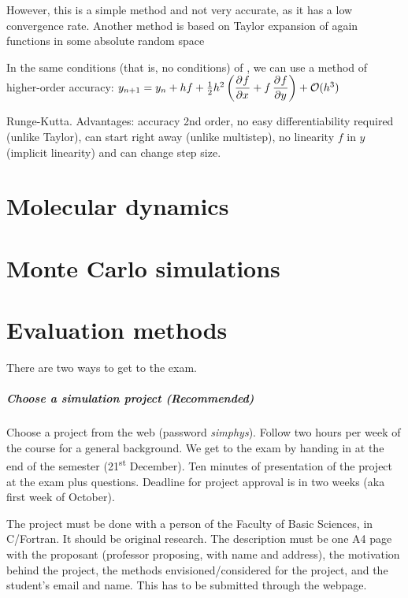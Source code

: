 \documentclass[palatino]{epflnotes}
\begin{document}
However, this is a simple method and not very accurate, as it has a low convergence rate. Another method is based on Taylor expansion of again functions in some absolute random space

\begin{prop} In the same conditions (that is, no conditions) of , we can use a method of higher-order accuracy: \( y_{n+1} = y_n + hf + \frac{1}{2}h^2 \left(\dpd{f}{x} + f \dpd{f}{y}\right) + \mathcal{O}(h^3) \label{eq:TaylorExpansion} \)
\end{prop}

Runge-Kutta. Advantages: accuracy 2nd order,  no easy differentiability required (unlike Taylor), can start right away (unlike multistep), no linearity $f$ in $y$ (implicit linearity)
 and can change step size.

\chapter{Molecular dynamics}

\chapter{Monte Carlo simulations}

\appendix

\chapter{Evaluation methods}

There are two ways to get to the exam.

\paragraph{Choose a simulation project (Recommended)} Choose a project from the web (password \textit{simphys}). Follow two hours per week of the course for a general background. We get to the exam by handing in at the end of the semester (21\textsuperscript{st} December). Ten minutes of presentation of the project at the exam plus questions. Deadline for project approval is in two weeks (aka first week of October).

The project must be done with a person of the Faculty of Basic Sciences, in C/Fortran. It should be original research. The description must be one A4 page with the proposant (professor proposing, with name and address), the motivation behind the project, the methods envisioned/considered for the project, and the student's email and name. This has to be submitted through the webpage.
\end{document}

